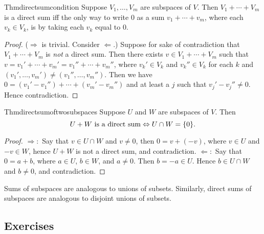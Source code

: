 \begin{reference}{Thm}{directsumcondition}
  Suppose $V_1,\dots,V_m$ are subspaces of $V$. Then $V_1+\cdots+V_m$ is a direct sum iff the only way to write 0 as a sum $v_1+\cdots+v_m$, where each $v_k\in V_k$, is by taking each $v_k$ equal to 0.
\end{reference}

\begin{proof}
  ($\Rightarrow$ is trivial. Consider $\Leftarrow$.)
  Suppose for sake of contradiction that $V_1+\cdots+V_m$ is \textit{not} a direct sum. Then there exists $v\in V_1+\cdots+V_m$ such that $v=v_1'+\cdots+v_m'=v_1''+\cdots+v_m''$, where $v_k'\in V_k$ and $v_k''\in V_k$ for each $k$ and $(v_1',\dots,v_m')\neq(v_1'',\dots,v_m'')$. Then we have $0=(v_1'-v_1'')+\cdots+(v_m'-v_m'')$ and at least a $j$ such that $v_j'-v_j''\neq0$. Hence contradiction.
\end{proof}

\begin{reference}{Thm}{directsumoftwosubspaces}
  Suppose $U$ and $W$ are subspaces of $V$. Then
  \[
    U+W\text{ is a direct sum}\Leftrightarrow U\cap W=\{0\}.\qedhere
  \]
\end{reference}

\begin{proof}
  $\Rightarrow:$ Say that $v\in U\cap W$ and $v\neq0$, then $0=v+(-v)$, where $v\in U$ and $-v\in W$, hence $U+W$ is not a direct sum, and contradiction.\newline
  $\Leftarrow:$ Say that $0=a+b$, where $a\in U$, $b\in W$, and $a\neq 0$. Then $b=-a\in U$. Hence $b\in U\cap W$ and $b\neq 0$, and contradiction.
\end{proof}

Sums of subspaces are analogous to unions of subsets. Similarly, direct sums of subspaces are analogous to disjoint unions of subsets.


\subsection*{Exercises}
